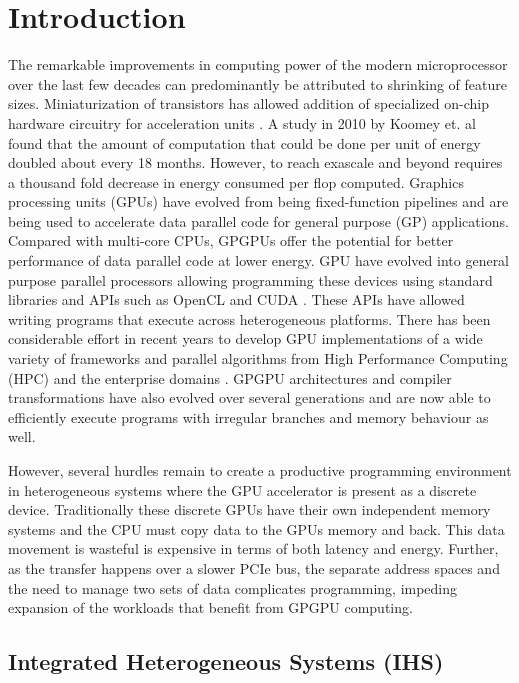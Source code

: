 \chapter{Introduction} \label{chap:introduction}

\par The remarkable improvements in computing power of the modern microprocessor over the last few decades can predominantly be attributed to shrinking of feature sizes. Miniaturization of transistors has allowed addition of specialized on-chip hardware circuitry for acceleration units \cite{accelerators-on-chip}.
A study in 2010 by Koomey et. al \cite{koomey} found that the amount of computation that could be done per unit of energy doubled about every 18 months. However, to reach exascale and beyond requires a thousand fold decrease in energy consumed per flop computed.
Graphics processing units (GPUs) have evolved from being fixed-function pipelines and are being used to accelerate data parallel code for general purpose (GP) applications. Compared with multi-core CPUs, GPGPUs offer the potential for better performance of data parallel code at lower energy. 
GPU have evolved into general purpose parallel processors allowing programming these devices using standard libraries and APIs such as OpenCL \cite{opencl}  and CUDA \cite{cuda}. These APIs have allowed writing programs that execute across heterogeneous platforms.
There has been considerable effort in recent years to develop GPU implementations of a wide variety of frameworks \cite{megha,fluidcl} and parallel algorithms from High Performance Computing (HPC) and the enterprise domains \cite{parboil,gpu-bfs}. GPGPU architectures and compiler transformations have also evolved over several generations and are now able to efficiently execute programs with irregular branches and memory behaviour as well. 
\par However, several hurdles remain to create a productive programming environment in heterogeneous systems where the GPU accelerator is present as a discrete device. Traditionally these discrete GPUs have their own independent memory systems and the CPU must copy data to the GPUs memory and back. This data movement is wasteful is expensive in terms of both latency and energy. Further, as the transfer happens over a slower PCIe bus, the separate address spaces and the need to manage two sets of data complicates programming, impeding expansion of the workloads that benefit from GPGPU computing.


\section{Integrated Heterogeneous Systems (IHS)} \label{ihs-intro}

